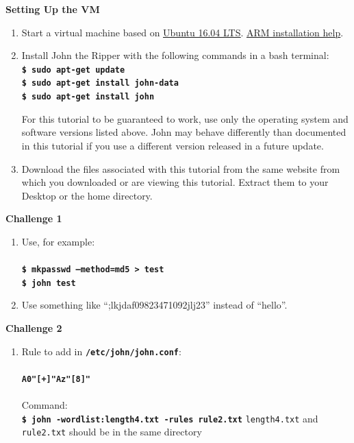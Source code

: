 \documentclass[12pt]{extarticle}
\newcommand{\code}[1]{\texttt{\bfseries#1}}
\newcommand{\ben}{\begin{enumerate}}
\newcommand{\een}{\end{enumerate}}
\begin{document}
	\textbf{Setting Up the VM}
	
	\begin{enumerate}
		\item Start a virtual machine based on \hyperref{https://releases.ubuntu.com/16.04/}{}{}{\underline{Ubuntu 16.04 LTS}}. \hyperref{https://wiki.ubuntu.com/ARM/Server/Install}{}{}{\underline{ARM installation help}}.
		\item Install John the Ripper with the following commands in a bash terminal:\\
		\code{\$ sudo apt-get update \\
			\$ sudo apt-get install john-data \\
			\$ sudo apt-get install john}
		
		For this tutorial to be guaranteed to work, use only the operating system and software versions listed above. John may behave differently than documented in this tutorial if you use a different version released in a future update.
		\item{Download the files associated with this tutorial from the same website from which you downloaded or are viewing this tutorial. Extract them to your Desktop or the home directory.}
	\end{enumerate}
	
	\textbf{Challenge 1}
	
	\ben
	
	\item Use, for example: \\\\
	\code{\$ mkpasswd --method=md5 > test\\
		\$ john test} \\
	
	\item Use something like ``;lkjdaf09823471092jlj23'' instead of ``hello''.
	
	\een
	
	\textbf{Challenge 2}
	\ben
	
	\item Rule to add in \code{/etc/john/john.conf}: \\\\
	\code{A0"[+]"Az"[8]"}\\\\
	Command:\\ \code{\$ john -wordlist:length4.txt -rules rule2.txt}
	\texttt{length4.txt} and \texttt{rule2.txt} should be in the same directory
	
	\een
	
\end{document}
